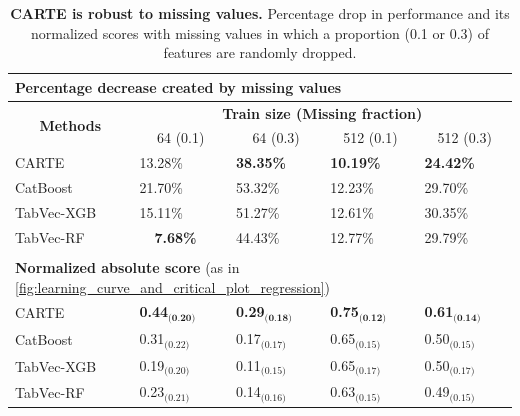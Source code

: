 \documentclass{article}
\theoremstyle{plain}
\theoremstyle{definition}
\theoremstyle{remark}
\begin{document}
\begin{table}[t]
\setlength{\tabcolsep}{5.909pt}
\small%
\begin{center}
\caption{\textbf{CARTE is robust to missing values.} Percentage drop in performance and its normalized scores with missing values in which a proportion (0.1 or 0.3) of features are randomly dropped.%
\label{tab:missing_values}
}
\begin{tabular}{p{}llll}
\multicolumn{5}{l}{\hspace{-0.7em}\textbf{Percentage decrease created by missing values}\vspace{1mm}}\\%
\toprule
\multicolumn{1}{c}{\multirow{2}{*}{\textbf{Methods}}} & \multicolumn{4}{c}{\textbf{Train size (Missing fraction)}} \\
\cmidrule(r){2-5}
& \multicolumn{1}{c}{64 (0.1)} & \multicolumn{1}{c}{64 (0.3)} & \multicolumn{1}{c}{512 (0.1)} & \multicolumn{1}{c}{512 (0.3)} \\
\midrule
\rowcolor{gray!25}
CARTE      & 13.28\%          & \textbf{38.35\%}   & \textbf{10.19\%} & \textbf{24.42\%} \\
CatBoost   & 21.70\%          & 53.32\%            & 12.23\%          & 29.70\% \\
\rowcolor{gray!25}
TabVec-XGB & 15.11\%          & 51.27\%            & 12.61\%          & 30.35\% \\
TabVec-RF  & ~\textbf{~7.68\%}  & 44.43\%            & 12.77\%          & 29.79\% \\
\bottomrule
\\
\multicolumn{5}{l}{\hspace{-0.7em}\textbf{Normalized absolute score} (as in  \autoref{fig:learning_curve_and_critical_plot_regression})\vspace{1mm}}\\
\toprule
\rowcolor{gray!25}
CARTE      & \textbf{0.44}$_{\textbf{(0.20)}}$ & \textbf{0.29}$_{\textbf{(0.18)}}$ & \textbf{0.75}$_{\textbf{(0.12)}}$ & \textbf{0.61}$_{\textbf{(0.14)}}$ \\
CatBoost   & 0.31$_{\text{(0.22)}}$ & 0.17$_{\text{(0.17)}}$   & 0.65$_{\text{(0.15)}}$ & 0.50$_{\text{(0.15)}}$ \\
\rowcolor{gray!25}
TabVec-XGB & 0.19$_{\text{(0.20)}}$ & 0.11$_{\text{(0.15)}}$   & 0.65$_{\text{(0.17)}}$ & 0.50$_{\text{(0.17)}}$ \\
TabVec-RF  & 0.23$_{\text{(0.21)}}$ & 0.14$_{\text{(0.16)}}$   & 0.63$_{\text{(0.15)}}$ & 0.49$_{\text{(0.15)}}$ \\
\bottomrule
\end{tabular}
\end{center}
\end{table}
\end{document}
